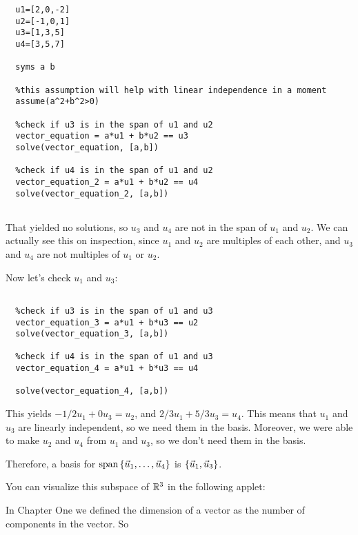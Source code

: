 \documentclass{ximera}
\begin{document}
\begin{exploration}
\begin{solution}
\begin{verbatim}
  u1=[2,0,-2]
  u2=[-1,0,1]
  u3=[1,3,5]
  u4=[3,5,7]

  syms a b

  %this assumption will help with linear independence in a moment
  assume(a^2+b^2>0)

  %check if u3 is in the span of u1 and u2
  vector_equation = a*u1 + b*u2 == u3
  solve(vector_equation, [a,b])

  %check if u4 is in the span of u1 and u2
  vector_equation_2 = a*u1 + b*u2 == u4
  solve(vector_equation_2, [a,b])
  

  \end{verbatim}

  That yielded no solutions, so $u_3$ and $u_4$ are not in the span of $u_1$ and $u_2$. We can actually see this on inspection, since $u_1$ and $u_2$ are multiples of each other, and $u_3$ and $u_4$ are not multiples of $u_1$ or $u_2$.

  Now let's check $u_1$ and $u_3$:

  \begin{verbatim}

  %check if u3 is in the span of u1 and u3
  vector_equation_3 = a*u1 + b*u3 == u2
  solve(vector_equation_3, [a,b])

  %check if u4 is in the span of u1 and u3
  vector_equation_4 = a*u1 + b*u3 == u4

  solve(vector_equation_4, [a,b])

  \end{verbatim}

  This yields $-1/2 u_1 + 0 u_3 = u_2$, and $2/3 u_1 + 5/3 u_3 = u_4$. This means that $u_1$ and $u_3$ are linearly independent, so we need them in the basis. Moreover, we were able to make $u_2$ and $u_4$ from $u_1$ and $u_3$, so we don't need them in the basis.

  Therefore, a basis for $\text{span}\left\{\vec{u}_1,\ldots,\vec{u}_4\right\}$ is $\left\{\vec{u}_1,\vec{u}_3\right\}$.

  You can visualize this subspace of $\mathbb{R}^3$ in the following applet:

  \begin{center}
  \end{center}

\end{solution}

\begin{remark}

  In Chapter One we defined the dimension of a vector as the number of components in the vector. So 


\end{remark}
\end{exploration}
\end{document}
